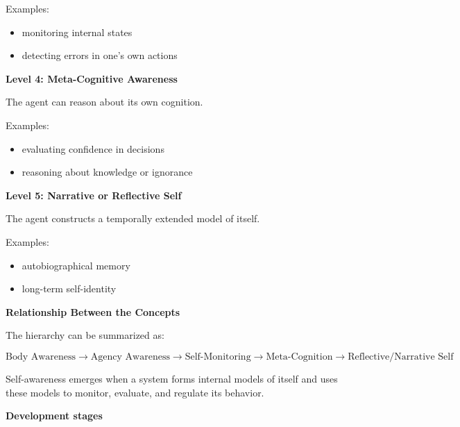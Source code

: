 \documentclass{book}
\providecommand{\ProjectDeepHeading}[2]{%
    \par\medskip\noindent\textbf{#2}\par\smallskip
}
\begin{document}
         Examples:

         \begin{itemize}
            \item monitoring internal states
            \item detecting errors in one's own actions
         \end{itemize}

      \ProjectDeepHeading{8}{Level 4: Meta-Cognitive Awareness}

         The agent can reason about its own cognition.

         Examples:

         \begin{itemize}
            \item evaluating confidence in decisions
            \item reasoning about knowledge or ignorance
         \end{itemize}

      \ProjectDeepHeading{8}{Level 5: Narrative or Reflective Self}

         The agent constructs a temporally extended model of itself.

         Examples:

         \begin{itemize}
            \item autobiographical memory
            \item long-term self-identity
         \end{itemize}


   \ProjectDeepHeading{7}{Relationship Between the Concepts}

      The hierarchy can be summarized as:

      \[
      \text{Body Awareness}
      \rightarrow
      \text{Agency Awareness}
      \rightarrow
      \text{Self-Monitoring}
      \rightarrow
      \text{Meta-Cognition}
      \rightarrow
      \text{Reflective/Narrative Self}
      \]

      Self-awareness emerges when a system forms internal models of itself and uses these models to monitor, evaluate, and regulate its behavior.

\ProjectDeepHeading{5}{Development stages}

\end{document}
